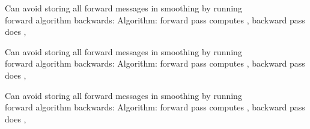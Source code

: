 \documentclass{article}
\begin{document}
\begin{huge}
\vspace{0.2in}

\textwidth
{}


Can avoid storing all forward messages in smoothing by running\\
forward algorithm backwards:
Algorithm: forward pass computes , backward pass does , 

\vspace{0.2in}

\textwidth
{}


Can avoid storing all forward messages in smoothing by running\\
forward algorithm backwards:
Algorithm: forward pass computes , backward pass does , 

\vspace{0.2in}

\textwidth
{}


Can avoid storing all forward messages in smoothing by running\\
forward algorithm backwards:
Algorithm: forward pass computes , backward pass does , 


\end{huge}
\end{document}
